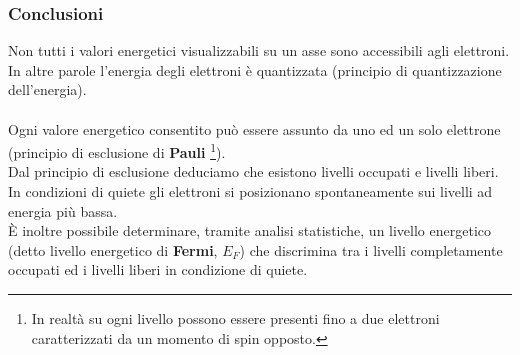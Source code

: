 \documentclass{article}
\numberwithin{equation}{subsection}
\begin{document}
	\subsubsection{Conclusioni}
	Non tutti i valori energetici visualizzabili su un asse sono accessibili agli elettroni.\\
	In altre parole l’energia degli elettroni è quantizzata (principio di quantizzazione dell’energia).\\\\
	Ogni valore energetico consentito può essere assunto da uno ed un solo elettrone (principio di esclusione di \textbf{Pauli} \footnote{In realtà su ogni livello possono essere presenti fino a due elettroni caratterizzati da un momento di spin opposto.}).\\
	Dal principio di esclusione deduciamo che esistono livelli occupati e livelli liberi.\\
	In condizioni di quiete gli elettroni si posizionano spontaneamente sui livelli ad energia più bassa.\\
	È inoltre possibile determinare, tramite analisi statistiche, un livello energetico (detto livello energetico di \textbf{Fermi}, $E_F$) che discrimina tra i livelli completamente occupati ed i livelli liberi in condizione di quiete.
\end{document}
